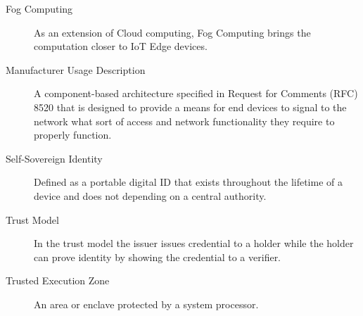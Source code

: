 \begin{description}
	\item [Fog Computing] As an extension of Cloud computing, Fog Computing brings the computation closer to IoT
	      Edge devices. \cite{nist:glossary}
	\item [Manufacturer Usage Description] A component-based architecture specified in Request for Comments (RFC)
	      8520 that is designed to provide a means for end devices to signal to the network what sort of access and
	      network functionality they require to properly function. \cite{nist:glossary}
	\item [Self-Sovereign Identity] Defined as a portable digital ID that exists throughout the lifetime of a device
	      and does not depending on a central authority. \cite {w3c2022did}
	\item [Trust Model] In the trust model the issuer issues credential to a holder while the holder can prove
	      identity by showing the credential to a verifier.
	\item [Trusted Execution Zone] An area or enclave protected by a system processor. \cite{nist:glossary}
\end{description}
